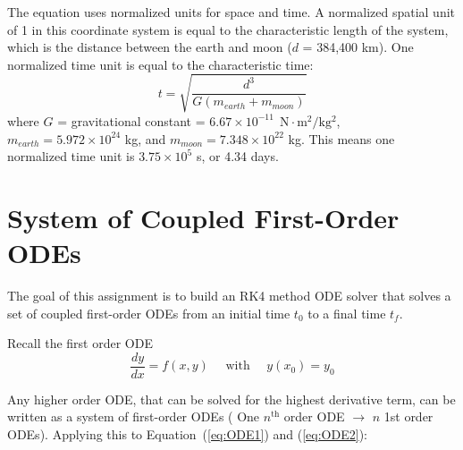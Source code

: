 \documentclass{article}
\newcommand{\deriv}[2]{\frac{d#1}{d#2}}
\begin{document}
\vspace{\baselineskip}

The equation uses normalized units for space and time. A normalized spatial unit of 1 in this coordinate
system is equal to the characteristic length of the system, which is the distance between the earth and moon
($d$ = 384,400 km). One normalized time unit is equal to the characteristic time:
\begin{equation*}
    t = \sqrt{\frac{d^3}{G\left(m_{earth} + m_{moon}\right)}}
\end{equation*}
where $G$ = gravitational constant = $6.67 \times 10^{-11} \SI{}{\ \N\cdot\m^2/\kg^2}$, $m_{earth} = 5.972 \times 10^{24}$ kg, and $m_{moon} = 7.348 \times 10^{22}$ kg. This means one normalized time unit is $3.75 \times 10^5$ s, or 4.34 days.

\pagebreak

\section{System of Coupled First-Order ODEs}

The goal of this assignment is to build an RK4 method ODE solver that solves a set of coupled first-order ODEs from an initial time $t_0$ to a final time $t_f$.

\vspace{\baselineskip}

Recall the first order ODE
\begin{equation*}
    \deriv{y}{x} = f(x,y) \quad \text{ with } \quad y(x_0) = y_0
\end{equation*}

Any higher order ODE, that can be solved for the highest derivative term, can be written as a system of first-order ODEs (\color{magenta} One $n^{\textrm{th}}$ order ODE $\rightarrow$ $n$ 1st order ODEs\color{white}). Applying this to Equation~(\ref{eq:ODE1}) and (\ref{eq:ODE2}):

\vspace{\baselineskip}
\end{document}
